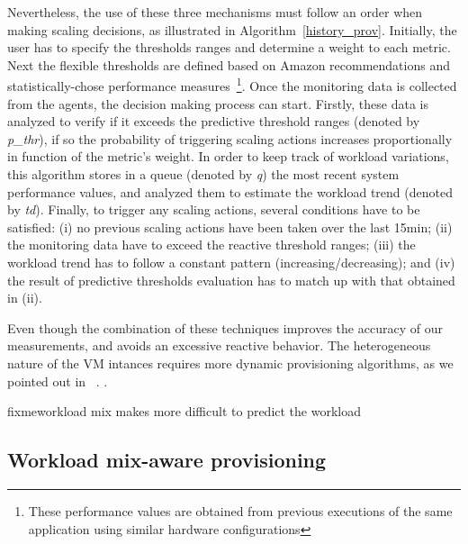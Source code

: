 
\vspace{3mm}

Nevertheless, the use of these three mechanisms must follow an order when making scaling decisions, as illustrated in Algorithm~\ref{history_prov}. Initially, the user has to specify the thresholds ranges and determine a weight to each metric. Next the flexible thresholds are defined based on Amazon recommendations and statistically-chose performance measures~\footnote{These performance values are obtained from previous executions of the same application using similar hardware configurations}. Once the monitoring data is collected from the agents, the decision making process can start. Firstly, these data is analyzed to verify if it exceeds the predictive threshold ranges (denoted by \emph{p\_thr}), if so the probability of triggering scaling actions increases proportionally in function of the metric's weight. In order to keep track of workload variations, this algorithm stores in a queue (denoted by \emph{q}) the most recent system performance values, and analyzed them  to estimate the workload trend (denoted by \emph{td}). Finally, to trigger any scaling actions, several conditions have to be satisfied: (i) no previous scaling actions have been taken over the last 15min; (ii) the monitoring data have to exceed the reactive threshold ranges; (iii) the workload trend has to follow a constant pattern (increasing/decreasing); and (iv) the result of predictive thresholds evaluation has to match up with that obtained in (ii). 

Even though the combination of these techniques improves the accuracy of our measurements, and avoids an excessive reactive behavior. The heterogeneous nature of the VM intances requires more dynamic provisioning algorithms, as we pointed out in ~\cite{jiangThesis}. . 

fixme{workload mix makes more difficult to predict the workload}

\subsection{Workload mix-aware provisioning}


